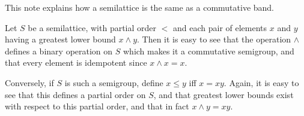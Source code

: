 \documentclass[12pt]{article}
\begin{document}
This note explains how a semilattice is the same as a commutative band.

Let $S$ be a semilattice, with partial order $<$ and each pair of elements $x$ and $y$ having a greatest lower bound $x \wedge y$.
Then it is easy to see that the operation $\wedge$ defines a binary operation on $S$ which makes it a commutative semigroup, and that every element is idempotent since $x \wedge x = x$.

Conversely, if $S$ is such a semigroup, define $x \leq y$ iff $x = xy$.  Again, it is easy to see that this defines a partial order on $S$, and that greatest lower bounds exist with respect to this partial order, and that in fact $x \wedge y = xy$.
\end{document}
